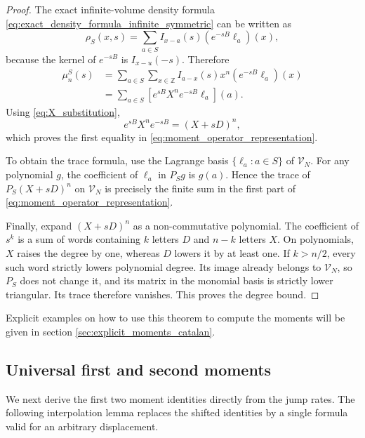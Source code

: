 \documentclass[11pt]{article}
\numberwithin{equation}{section}
\newcommand{\1}{\mathbf 1}
\begin{document}
\begin{proof}
The exact infinite-volume density formula
\eqref{eq:exact_density_formula_infinite_symmetric} can be written as
\begin{equation}
    \rho_S(x,s)
    =
    \sum_{a\in S}I_{x-a}(s)
    \left(e^{-sB}\ell_a\right)(x),
    \label{eq:general_density_operator_form}
\end{equation}
because the kernel of \(e^{-sB}\) is \(I_{x-u}(-s)\).  Therefore
\[
\begin{aligned}
    \mu_n^S(s)
    &=
    \sum_{a\in S}\sum_{x\in\mathbb Z}
    I_{a-x}(s)x^n\left(e^{-sB}\ell_a\right)(x)
    \\
    &=
    \sum_{a\in S}
    \left[e^{sB}X^ne^{-sB}\ell_a\right](a).
\end{aligned}
\]
Using \eqref{eq:X_substitution},
\[
    e^{sB}X^ne^{-sB}=(X+sD)^n,
\]
which proves the first equality in
\eqref{eq:moment_operator_representation}.

To obtain the trace formula, use the Lagrange basis
\(\{\ell_a:a\in S\}\) of \(\mathcal V_N\).  For any polynomial \(g\), the
coefficient of \(\ell_a\) in \(P_Sg\) is \(g(a)\).  Hence the trace of
\(P_S(X+sD)^n\) on \(\mathcal V_N\) is precisely the finite sum in the first
part of \eqref{eq:moment_operator_representation}.

Finally, expand \((X+sD)^n\) as a non-commutative polynomial.  The coefficient
of \(s^k\) is a sum of words containing \(k\) letters \(D\) and \(n-k\)
letters \(X\).  On polynomials, \(X\) raises the degree by one, whereas \(D\)
lowers it by at least one.  If \(k>n/2\), every such word strictly lowers
polynomial degree.  Its image already belongs to \(\mathcal V_N\), so \(P_S\)
does not change it, and its matrix in the monomial basis is strictly lower
triangular.  Its trace therefore vanishes.  This proves the degree bound.
\end{proof}
Explicit examples on how to use this theorem to compute the moments will be given in section \ref{sec:explicit_moments_catalan}.

\subsection{Universal first and second moments}

We next derive the first two moment identities directly from the jump rates.
The following interpolation lemma replaces the shifted identities by a single
formula valid for an arbitrary displacement.
\end{document}
